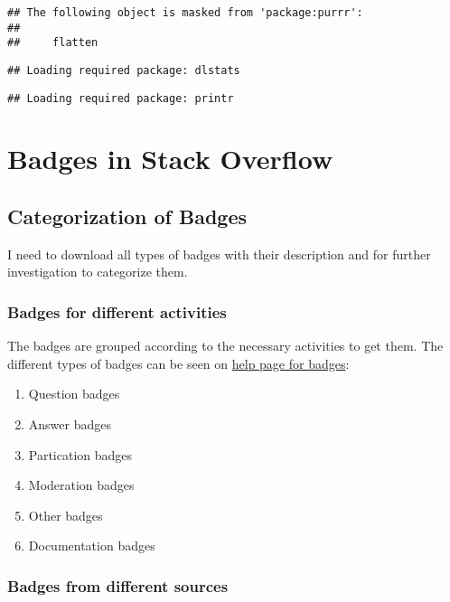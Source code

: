 \documentclass[]{book}
\providecommand{\tightlist}{%
  \setlength{\itemsep}{0pt}\setlength{\parskip}{0pt}}
\theoremstyle{definition}
\theoremstyle{definition}
\theoremstyle{definition}
\theoremstyle{remark}
\begin{document}
\begin{verbatim}
## The following object is masked from 'package:purrr':
## 
##     flatten
\end{verbatim}

\begin{verbatim}
## Loading required package: dlstats
\end{verbatim}

\begin{verbatim}
## Loading required package: printr
\end{verbatim}

\chapter{Badges in Stack Overflow}\label{badges-in-stack-overflow}

\section{Categorization of Badges}\label{categorization-of-badges}

I need to download all types of badges with their description and for
further investigation to categorize them.

\subsection{Badges for different
activities}\label{badges-for-different-activities}

The badges are grouped according to the necessary activities to get
them. The different types of badges can be seen on
\href{https://stackoverflow.com/help/badges}{help page for badges}:

\begin{enumerate}
\def\labelenumi{\arabic{enumi})}
\tightlist
\item
  Question badges
\item
  Answer badges
\item
  Partication badges
\item
  Moderation badges
\item
  Other badges
\item
  Documentation badges
\end{enumerate}

\subsection{Badges from different
sources}\label{badges-from-different-sources}
\end{document}
